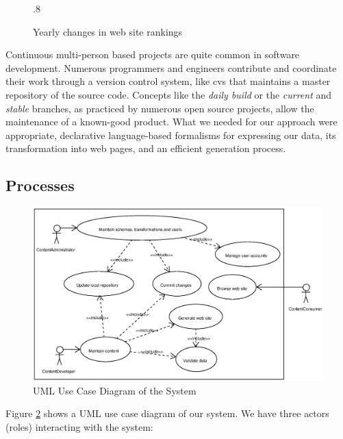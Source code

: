 \documentclass[10pt]{article}
\def\epsfsize#1#2{\ifdim#1>\columnwidth\columnwidth\else#1\fi}
\begin{document}
\label{sec:design}
\begin{figure}[h!]
\begin{center}
\leavevmode
\def\epsfsize#1#2{\epsfxsize}
\epsfysize.8\vsize
{}
\end{center}
\caption{Yearly changes in web site rankings}
\label{fig:rankyear}
\end{figure}

Continuous multi-person based projects are quite
common in software development.
Numerous programmers and engineers contribute and coordinate their work
through a version control system, like {\sc cvs} \cite{BF01} that
maintains a master repository of the source code.
Concepts like the \textit{daily build} \cite{CS95b} or the
\textit{current} and \textit{stable} branches, as practiced by
numerous open source projects, allow the maintenance
of a known-good product.
What we needed for our approach were appropriate,
declarative language-based formalisms for expressing our data,
its transformation into web pages, and an efficient
generation process.

\subsection{Processes}

\begin{figure}[h!]
\includegraphics[scale=0.5]{use-case-diagram}
\caption{UML Use Case Diagram of the System}
\label{fig:use-case-diagram}
\end{figure}

Figure \ref{fig:use-case-diagram} shows a {\sc UML} \cite{UML} use case diagram of our system. 
We have three actors (roles) interacting with the system:
\end{document}
